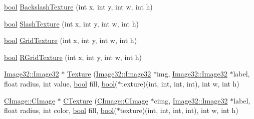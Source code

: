 \begin{DoxyCompactItemize}
\item 
\hyperlink{namespacegft_a033dba4822661600b08d2bbf16879252}{bool} \hyperlink{namespacegft_1_1Highlight_a14519e583ca76f920be299c454fc1774}{Backslash\-Texture} (int x, int y, int w, int h)
\item 
\hyperlink{namespacegft_a033dba4822661600b08d2bbf16879252}{bool} \hyperlink{namespacegft_1_1Highlight_abb9a4ffae773a19590ff3e8e7d4a5230}{Slash\-Texture} (int x, int y, int w, int h)
\item 
\hyperlink{namespacegft_a033dba4822661600b08d2bbf16879252}{bool} \hyperlink{namespacegft_1_1Highlight_af6fa2ff7f79719bf1c8217ebf481562d}{Grid\-Texture} (int x, int y, int w, int h)
\item 
\hyperlink{namespacegft_a033dba4822661600b08d2bbf16879252}{bool} \hyperlink{namespacegft_1_1Highlight_a8c1fb3e12e9c6e148f6e12557d9567d7}{R\-Grid\-Texture} (int x, int y, int w, int h)
\item 
\hyperlink{namespacegft_1_1Image32_a6c5a03566b593bb406f1fe33266a0382}{Image32\-::\-Image32} $\ast$ \hyperlink{namespacegft_1_1Highlight_ac99c5229fa377a04771f25b63438340f}{Texture} (\hyperlink{namespacegft_1_1Image32_a6c5a03566b593bb406f1fe33266a0382}{Image32\-::\-Image32} $\ast$img, \hyperlink{namespacegft_1_1Image32_a6c5a03566b593bb406f1fe33266a0382}{Image32\-::\-Image32} $\ast$label, float radius, int value, \hyperlink{namespacegft_a033dba4822661600b08d2bbf16879252}{bool} fill, \hyperlink{namespacegft_a033dba4822661600b08d2bbf16879252}{bool}($\ast$texture)(int, int, int, int), int w, int h)
\item 
\hyperlink{namespacegft_1_1CImage_ae3efa12a0ed0755314837d3e5c974556}{C\-Image\-::\-C\-Image} $\ast$ \hyperlink{namespacegft_1_1Highlight_a52dfcd3a303d8889c3d48667473491fe}{C\-Texture} (\hyperlink{namespacegft_1_1CImage_ae3efa12a0ed0755314837d3e5c974556}{C\-Image\-::\-C\-Image} $\ast$cimg, \hyperlink{namespacegft_1_1Image32_a6c5a03566b593bb406f1fe33266a0382}{Image32\-::\-Image32} $\ast$label, float radius, int color, \hyperlink{namespacegft_a033dba4822661600b08d2bbf16879252}{bool} fill, \hyperlink{namespacegft_a033dba4822661600b08d2bbf16879252}{bool}($\ast$texture)(int, int, int, int), int w, int h)
\end{DoxyCompactItemize}


